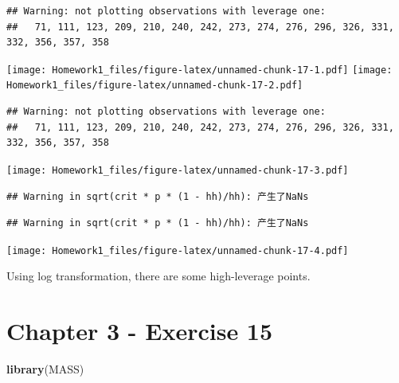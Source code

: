 \documentclass[]{article}
\newenvironment{Shaded}{\begin{snugshade}}{\end{snugshade}}
\newcommand{\KeywordTok}[1]{\textcolor[rgb]{0.13,0.29,0.53}{\textbf{#1}}}
\newcommand{\NormalTok}[1]{#1}
\begin{document}
\begin{verbatim}
## Warning: not plotting observations with leverage one:
##   71, 111, 123, 209, 210, 240, 242, 273, 274, 276, 296, 326, 331, 332, 356, 357, 358
\end{verbatim}

\texttt{[image: Homework1\_files/figure-latex/unnamed-chunk-17-1.pdf]}
\texttt{[image: Homework1\_files/figure-latex/unnamed-chunk-17-2.pdf]}

\begin{verbatim}
## Warning: not plotting observations with leverage one:
##   71, 111, 123, 209, 210, 240, 242, 273, 274, 276, 296, 326, 331, 332, 356, 357, 358
\end{verbatim}

\texttt{[image: Homework1\_files/figure-latex/unnamed-chunk-17-3.pdf]}

\begin{verbatim}
## Warning in sqrt(crit * p * (1 - hh)/hh): 产生了NaNs
\end{verbatim}

\begin{verbatim}
## Warning in sqrt(crit * p * (1 - hh)/hh): 产生了NaNs
\end{verbatim}

\texttt{[image: Homework1\_files/figure-latex/unnamed-chunk-17-4.pdf]}

Using log transformation, there are some high-leverage points.

\section{Chapter 3 - Exercise 15}\label{chapter-3---exercise-15}

\begin{Shaded}
\begin{Highlighting}[]
\KeywordTok{library}\NormalTok{(MASS)}
\end{Highlighting}
\end{Shaded}
\end{document}
